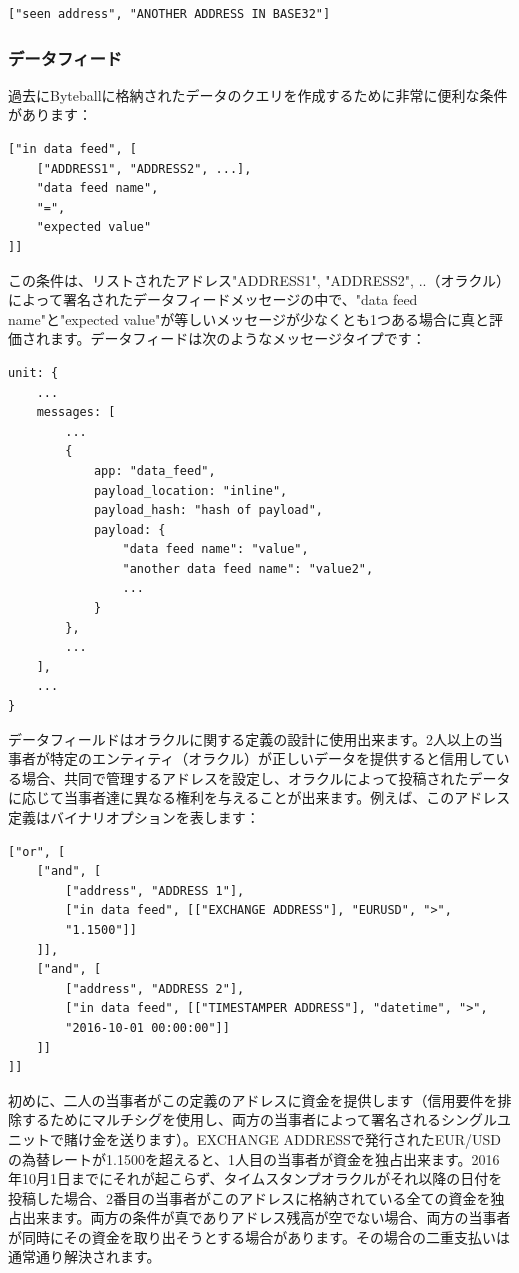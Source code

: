 \documentclass[a4paper, dvipdfmx]{jsarticle}
\begin{document}
\begin{lstlisting}[basicstyle=\ttfamily\footnotesize, frame=none]
["seen address", "ANOTHER ADDRESS IN BASE32"]
\end{lstlisting}

\subsubsection{データフィード}
過去にByteballに格納されたデータのクエリを作成するために非常に便利な条件があります：
\begin{lstlisting}[basicstyle=\ttfamily\footnotesize, frame=none]
["in data feed", [
    ["ADDRESS1", "ADDRESS2", ...],
    "data feed name",
    "=",
    "expected value"
]]
\end{lstlisting}

\noindent この条件は、リストされたアドレス"ADDRESS1", "ADDRESS2", ..（オラクル）によって署名されたデータフィードメッセージの中で、"data feed name"と"expected value"が等しいメッセージが少なくとも1つある場合に真と評価されます。データフィードは次のようなメッセージタイプです：

\begin{lstlisting}[basicstyle=\ttfamily\footnotesize, frame=none]
unit: {
    ...
    messages: [
        ...
        {
            app: "data_feed",
            payload_location: "inline",
            payload_hash: "hash of payload",
            payload: {
                "data feed name": "value",
                "another data feed name": "value2",
                ...
            }
        },
        ...
    ],
    ...
}
\end{lstlisting}

データフィールドはオラクルに関する定義の設計に使用出来ます。2人以上の当事者が特定のエンティティ（オラクル）が正しいデータを提供すると信用している場合、共同で管理するアドレスを設定し、オラクルによって投稿されたデータに応じて当事者達に異なる権利を与えることが出来ます。例えば、このアドレス定義はバイナリオプションを表します：

\begin{lstlisting}[basicstyle=\ttfamily\footnotesize, frame=none]
["or", [
    ["and", [
        ["address", "ADDRESS 1"],
        ["in data feed", [["EXCHANGE ADDRESS"], "EURUSD", ">",
        "1.1500"]]
    ]],
    ["and", [
        ["address", "ADDRESS 2"],
        ["in data feed", [["TIMESTAMPER ADDRESS"], "datetime", ">",
        "2016-10-01 00:00:00"]]
    ]]
]]
\end{lstlisting}

\noindent 初めに、二人の当事者がこの定義のアドレスに資金を提供します（信用要件を排除するためにマルチシグを使用し、両方の当事者によって署名されるシングルユニットで賭け金を送ります）。EXCHANGE ADDRESSで発行されたEUR/USDの為替レートが1.1500を超えると、1人目の当事者が資金を独占出来ます。2016年10月1日までにそれが起こらず、タイムスタンプオラクルがそれ以降の日付を投稿した場合、2番目の当事者がこのアドレスに格納されている全ての資金を独占出来ます。両方の条件が真でありアドレス残高が空でない場合、両方の当事者が同時にその資金を取り出そうとする場合があります。その場合の二重支払いは通常通り解決されます。
\end{document}
